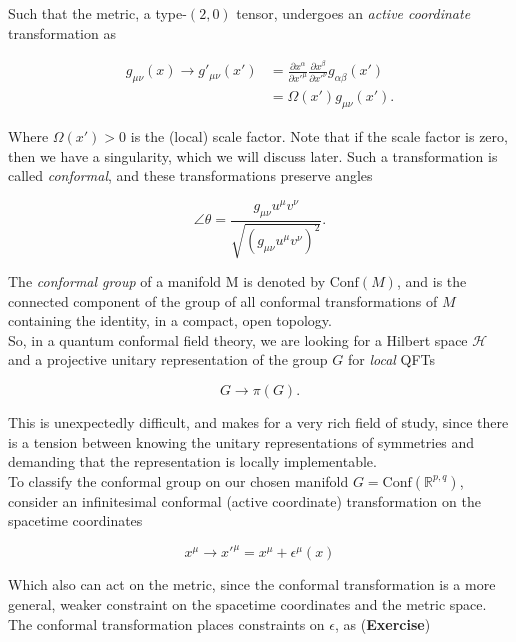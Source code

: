 \documentclass[10pt]{article}
\begin{document}
\noindent Such that the metric, a type-$(2,0)$ tensor, undergoes an \textit{active coordinate} transformation as

\begin{align}
g_{\mu\nu} (x) \rightarrow g'_{\mu\nu} (x') &= \frac{\partial x^\alpha}{\partial x'^\mu} \frac{\partial x^\beta}{\partial x'^\nu} g_{\alpha \beta} (x') \\ 
&= \Omega (x') g_{\mu\nu} (x').
\end{align}

\noindent Where $\Omega(x') > 0$ is the (local) scale factor. Note that if the scale factor is zero, then we have a singularity, which we will discuss later. Such a transformation is called \textit{conformal}, and these transformations preserve angles

\begin{equation}
\angle \theta = \frac{g_{\mu\nu} u^\mu v^\nu}{\sqrt{(g_{\mu\nu} u^\mu v^\nu)^2}}.
\end{equation}

\noindent The \textit{conformal group} of a manifold M is denoted by $\text{Conf}(M)$, and is the connected component of the group of all conformal transformations of $M$ containing the identity, in a compact, open topology. \\

\noindent So, in a quantum conformal field theory, we are looking for a Hilbert space $\mathcal{H}$ and a projective unitary representation of the group $G$ for \textit{local} QFTs

\begin{equation}
G \rightarrow \pi (G).
\end{equation}

\noindent This is unexpectedly difficult, and makes for a very rich field of study, since there is a tension between knowing the unitary representations of symmetries and demanding that the representation is locally implementable. \\

\noindent To classify the conformal group on our chosen manifold $G = \text{Conf} (\mathbb{R}^{p,q})$, consider an infinitesimal conformal (active coordinate) transformation on the spacetime coordinates

\begin{equation}
x^\mu \rightarrow x'^\mu = x^\mu +  \epsilon^\mu (x)
\end{equation}

\noindent Which also can act on the metric, since the conformal transformation is a more general, weaker constraint on the spacetime coordinates and the metric space. The conformal transformation places constraints on $\epsilon$, as (\textbf{Exercise})
\end{document}
